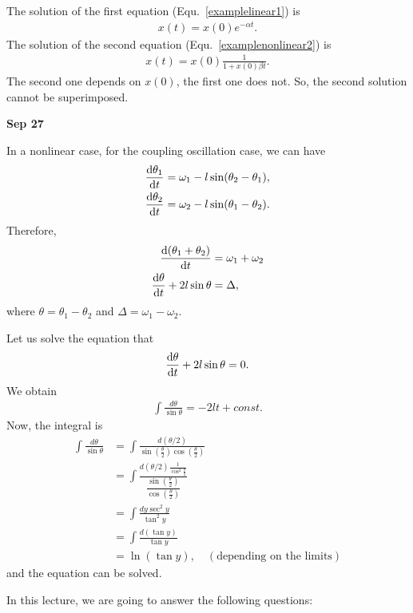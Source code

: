 The solution of the first equation (Equ.~\eqref{examplelinear1}) is
\begin{align}
x(t)= x(0) e^{-\alpha t}.
\end{align} 
The solution of the second equation (Equ.~\eqref{examplenonlinear2}) is
\begin{align}
x(t)= x(0)\frac{1}{1+x(0)\beta t}.
\end{align}
The second one depends on $ x(0) $, the first one does not. So, the second solution cannot be superimposed.


\textbf{Sep 27}

In a nonlinear case, for the coupling oscillation case, we can have
\begin{align}
\frac{{\mathrm d} {\theta_1}}{{\mathrm d}t} &=\omega_1 - l\sin(\theta_2-\theta_1),\label {coupling1nonlinear}\\
\frac{{\mathrm d} {\theta_2}}{{\mathrm d}t} &= \omega_2 - l\sin(\theta_1-\theta_2).\label {coupling2nonlinear}
\end{align}
Therefore, 
\begin{align}
\frac{{\mathrm d} {(\theta_1 + \theta_2)}}{{\mathrm d}t}&= \omega_1+\omega_2\\
\frac{{\mathrm d} {\theta}}{{\mathrm d}t}+2l\sin\theta &= \Delta,
\end{align}
where $ \theta=\theta_1-\theta_2 $ and $ \Delta=\omega_1 -\omega_2 $. 

Let us solve the equation that
\begin{align}
\frac{{\mathrm d} {\theta}}{{\mathrm d}t}+2l\sin\theta=0.
\end{align}
We obtain 
\begin{align}
\int \frac{d\theta}{\sin \theta}=-2l t + const.
\end{align}
Now, the integral is
\begin{align}
\int \frac{d\theta}{\sin \theta} &= \int \frac{d\left(\theta/2 \right)}{\sin\left(\frac{\theta}{2} \right)\cos\left(\frac{\theta}{2} \right)} \\
&= \int \frac{d\left(\theta/2 \right) \frac{1}{\cos^2\frac{\theta}{2}}}{\dfrac{\sin\left(\frac{\theta}{2} \right)}{\cos\left(\frac{\theta}{2} \right)}}\\
&= \int \frac{dy\sec^2 y}{\tan^2 y}\\
&= \int \frac{d \left(\tan y \right)}{\tan y}\\
&= \ln \left(\tan y \right) ,\quad (\text{depending on the limits})
\end{align}
and the equation can be solved. 

In this lecture, we are going to answer the following questions:

